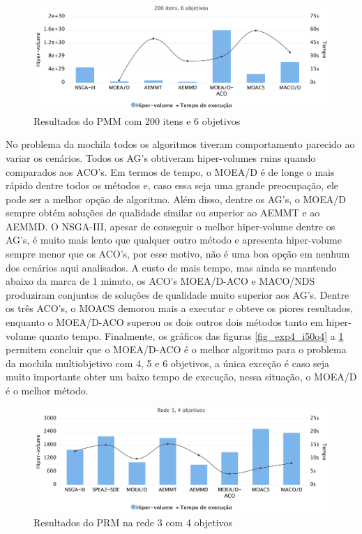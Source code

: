 \begin{figure}[!htbp]
	\caption{Resultados do PMM com 200 itens e 6 objetivos}
	\label{fig_exp4_i200o6}
	\includegraphics[width=1\textwidth]{cap_experimentos/figs/etapa4/i200o6}
\end{figure}

No problema da mochila todos os algoritmos tiveram comportamento parecido ao variar os cenários. Todos os AG's obtiveram hiper-volumes ruins quando comparados aos ACO's. Em termos de tempo, o MOEA/D é de longe o mais rápido dentre todos os métodos e, caso essa seja uma grande preocupação, ele pode ser a melhor opção de algoritmo. Além disso, dentre os AG's, o MOEA/D sempre obtém soluções de qualidade similar ou superior ao AEMMT e ao AEMMD. O NSGA-III, apesar de conseguir o melhor hiper-volume dentre os AG's, é muito mais lento que qualquer outro método e apresenta hiper-volume sempre menor que os ACO's, por esse motivo, não é uma boa opção em nenhum dos cenários aqui analisados. A custo de mais tempo, mas ainda se mantendo abaixo da marca de 1 minuto, os ACO's MOEA/D-ACO e MACO/NDS produziram conjuntos de soluções de qualidade muito superior aos AG's. Dentre os três ACO's, o MOACS demorou mais a executar e obteve os piores resultados, enquanto o MOEA/D-ACO superou os dois outros dois métodos tanto em hiper-volume quanto tempo. Finalmente, os gráficos das figuras \ref{fig_exp4_i50o4} a \ref{fig_exp4_i200o6} permitem concluir que o MOEA/D-ACO é o melhor algoritmo para o problema da mochila multiobjetivo com 4, 5 e 6 objetivos, a única exceção é caso seja muito importante obter um baixo tempo de execução, nessa situação, o MOEA/D é o melhor método.

\begin{figure}[!htbp]
	\caption{Resultados do PRM na rede 3 com 4 objetivos}
	\label{fig_exp4_r3o4}
	\includegraphics[width=1\textwidth]{cap_experimentos/figs/etapa4/r3o4}
\end{figure}

